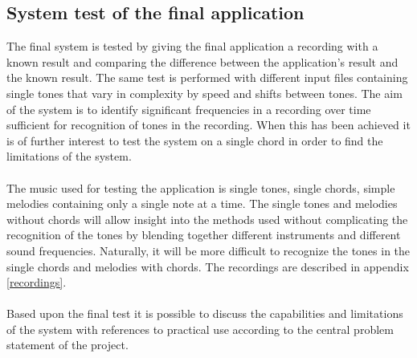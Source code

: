 \subsection{System test of the final application}
The final system is tested by giving the final application a recording with a known result and comparing the difference between the application's result and the known result. The same test is performed with different input files containing single tones that vary in complexity by speed and shifts between tones. The aim of the system is to identify significant frequencies in a recording over time sufficient for recognition of tones in the recording. When this has been achieved it is of further interest to test the system on a single chord in order to find the limitations of the system.
\\\\
The music used for testing the application is single tones, single chords, simple melodies containing only a single note at a time. The single tones and melodies without chords will allow insight into the methods used without complicating the recognition of the tones by blending together different instruments and different sound frequencies. Naturally, it will be more difficult to recognize the tones in the single chords and melodies with chords. The recordings are described in appendix \ref{recordings}. \\
\\
Based upon the final test it is possible to discuss the capabilities and limitations of the system with references to practical use according to the central problem statement of the project.  